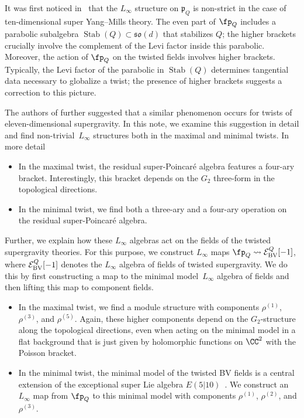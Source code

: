 \documentclass[pdftex]{sigma}
\numberwithin{equation}{section}
\theoremstyle{definition}
\def\cE{\mathcal E}\def\cF{\mathcal F}\def\cG{\mathcal G}\def\cH{\mathcal H}
\begin{document}
It was first noticed in~\cite{JKY} that the $L_\infty$ structure on $\mathfrak{p}_Q$ is non-strict in the case of ten-dimensional super Yang--Mills theory. The even part of $\fp_Q$ includes a parabolic subalgebra $\operatorname{Stab}(Q)\subset \mathfrak{so}(d)$ that stabilizes $Q$; the higher brackets crucially involve the complement of the Levi factor inside this parabolic. Moreover, the action of $\fp_Q$ on the twisted fields involves higher brackets. Typically, the Levi factor of the parabolic in $\operatorname{Stab}(Q)$ determines tangential data necessary to globalize a twist; the presence of higher brackets suggests a correction to this picture.

The authors of \cite{JKY} further suggested that a similar phenomenon occurs for twists of eleven-dimensional supergravity. In this note, we examine this suggestion in detail and find non-trivial~$L_\infty$ structures both in the maximal and minimal twists. In more detail
\begin{itemize}\itemsep=0pt
 \item[--] In the maximal twist, the residual super-Poincar\'e algebra features a four-ary bracket. Interestingly, this bracket depends on the $G_2$ three-form in the topological directions.
 \item[--] In the minimal twist, we find both a three-ary and a four-ary operation on the residual super-Poincar\'e algebra.
\end{itemize}
Further, we explain how these $L_\infty$ algebras act on the fields of the twisted supergravity theories. For this purpose, we construct $L_\infty$ maps $\fp_Q \rightsquigarrow \cE^{Q}_{\rm BV}[-1]$, where $ \cE^{Q}_{\rm BV}[-1]$ denotes the $L_\infty$ algebra of fields of twisted supergravity. We do this by first constructing a map to the minimal model~$L_\infty$ algebra of fields and then lifting this map to component fields.
\begin{itemize}\itemsep=0pt
 \item[--] In the maximal twist, we find a module structure with components $\rho^{(1)}$, $\rho^{(3)}$, and $\rho^{(5)}$. Again, these higher components depend on the $G_2$-structure along the topological directions, even when acting on the minimal model in a flat background that is just given by holomorphic functions on $\CC^2$ with the Poisson bracket.
 \item[--] In the minimal twist, the minimal model of the twisted BV fields is a central extension of the exceptional super Lie algebra $E(5|10)$~\cite{RSW}. We construct an $L_\infty$ map from $\fp_Q$ to this minimal model with components $\rho^{(1)}$, $\rho^{(2)}$, and $\rho^{(3)}$.
\end{itemize}
\end{document}
